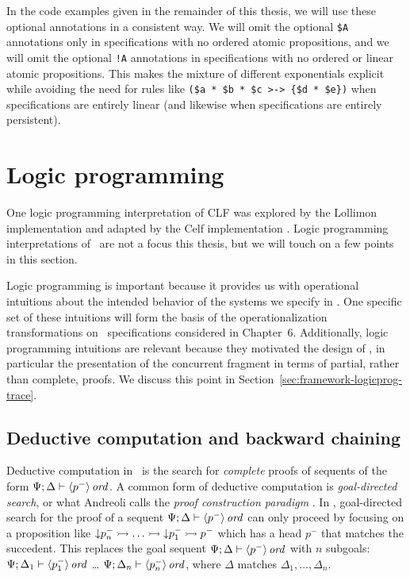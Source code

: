 In the code examples given in the remainder of this thesis, we will
use these optional annotations in a consistent way.  We will omit the
optional \verb|$A| annotations only in specifications with no ordered
atomic propositions, and we will omit the optional \verb|!A|
annotations in specifications with no ordered or linear atomic
propositions. This makes the mixture of different exponentials
explicit while avoiding the need for rules like
\verb|($a * $b * $c >-> {$d * $e})| when specifications are entirely
linear (and likewise when specifications are entirely persistent).

\section{Logic programming}
\label{sec:framework-logicprog}

One logic programming interpretation of CLF was explored by the
Lollimon implementation \cite{lopez05monadic} and adapted by the Celf
implementation \cite{schacknielsen08celf}. Logic programming
interpretations of \sls~are not a focus this thesis, but we will touch
on a few points in this section. 

Logic programming is important because it provides us with operational
intuitions about the intended behavior of the systems we specify in
\sls. One specific set of these intuitions will form the basis of the
operationalization transformations on \sls~specifications considered
in Chapter~6. Additionally, logic programming intuitions are relevant
because they motivated the design of \sls, in particular the
presentation of the concurrent fragment in terms of partial, rather
than complete, proofs. We discuss this point in
Section~\ref{sec:framework-logicprog-trace}.

\subsection{Deductive computation and backward chaining}
\label{sec:framework-logicprog-deductive}
\label{sec:framework-modes}

Deductive computation in \sls~is the search for {\it complete} proofs
of sequents of the form ${\Psi};{\Delta} \vdash {{\langle {p^-} \rangle}\,{{\it ord}}} \mathstrut$.  A
common form of deductive computation is {\it goal-directed search}, or
what Andreoli calls the {\it proof construction paradigm}
\cite{andreoli01focussing}.
In \sls, goal-directed search for the proof of a sequent
${\Psi};{\Delta} \vdash {{\langle {p^-} \rangle}\,{{\it ord}}} \mathstrut$ can only proceed by focusing
on a proposition like ${\downarrow}p_n^- \rightarrowtail \ldots \rightarrowtail
{\downarrow}p_1^- \rightarrowtail p^-$ which has a head $p^-$ that matches the
succedent. This replaces the goal sequent
${\Psi};{\Delta} \vdash {{\langle {p^-} \rangle}\,{{\it ord}}} \mathstrut$ with $n$ subgoals:
${\Psi};{\Delta_1} \vdash {{\langle {p_1^-} \rangle}\,{{\it ord}}} \mathstrut$ \ldots
${\Psi};{\Delta_n} \vdash {{\langle {p_n^-} \rangle}\,{{\it ord}}} \mathstrut$, where $\Delta$ matches
$\Delta_1,\ldots,\Delta_n$.


